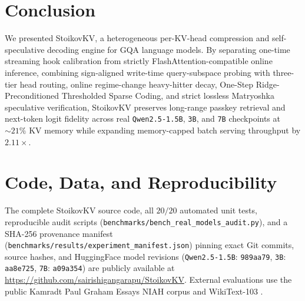 \documentclass[conference]{IEEEtran}
\begin{document}
\section{Conclusion}
We presented StoikovKV, a heterogeneous per-KV-head compression and self-speculative decoding engine for GQA language models. By separating one-time streaming hook calibration from strictly FlashAttention-compatible online inference, combining sign-aligned write-time query-subspace probing with three-tier head routing, online regime-change heavy-hitter decay, One-Step Ridge-Preconditioned Thresholded Sparse Coding, and strict lossless Matryoshka speculative verification, StoikovKV preserves long-range passkey retrieval and next-token logit fidelity across real \texttt{Qwen2.5-1.5B}, \texttt{3B}, and \texttt{7B} checkpoints at $\sim 21\%$ KV memory while expanding memory-capped batch serving throughput by $2.11\times$.

\section*{Code, Data, and Reproducibility}
The complete StoikovKV source code, all $20/20$ automated unit tests, reproducible audit scripts (\texttt{benchmarks/bench\_real\_models\_audit.py}), and a SHA-256 provenance manifest (\texttt{benchmarks/results/experiment\_manifest.json}) pinning exact Git commits, source hashes, and HuggingFace model revisions (\texttt{Qwen2.5-1.5B}: \texttt{989aa79}, \texttt{3B}: \texttt{aa8e725}, \texttt{7B}: \texttt{a09a354}) are publicly available at \url{https://github.com/sairishigangarapu/StoikovKV}. External evaluations use the public Kamradt Paul Graham Essays NIAH corpus \cite{b15} and WikiText-103 \cite{b16}.
\end{document}
